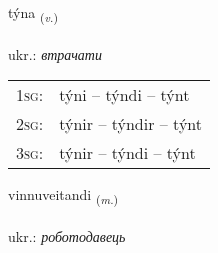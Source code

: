 \documentclass[frontgrid, backgrid]{flacards}\usepackage[]{graphicx}\usepackage[]{xcolor}
\begin{document}
\renewcommand{\flhead}{\vskip5pt \fboxsep=0pt {\small\bfseries\footnotesize Sagnorð | дієслово}}
\renewcommand{\fcfoot}{\vskip5pt \fboxsep=0pt \hspace{2pt}{\small\bfseries\footnotesize 3K}}

\renewcommand{\blhead}{\vskip5pt {\small\bfseries\footnotesize Sagnorð | дієслово }}
\renewcommand{\bcfoot}{\vskip5pt \hspace{2pt}{\small\bfseries\footnotesize 3K}}


{týna \small{\textsubscript{(\textit{v.})}} \\[1ex] %
\textphonetic{[tʰiːna]} \\
ukr.: \emph{втрачати} \\  [2ex]
\renewcommand*{\arraystretch}{0.8}
\begin{tabular}{p{1cm}l}
\textsc{1sg}: & týni -- týndi -- týnt \\ 
\textsc{2sg}: & týnir -- týndir -- týnt \\ 
\textsc{3sg}: & týnir -- týndi -- týnt \\ 
\end{tabular}
}

\renewcommand{\flhead}{\vskip5pt \fboxsep=0pt {\small\bfseries\footnotesize Nafnorð | іменник}}
\renewcommand{\fcfoot}{\vskip5pt \fboxsep=0pt \hspace{2pt}{\small\bfseries\footnotesize 3K}}

\renewcommand{\blhead}{\vskip5pt {\small\bfseries\footnotesize Nafnorð | іменник }}
\renewcommand{\bcfoot}{\vskip5pt \hspace{2pt}{\small\bfseries\footnotesize 3K}}


{vinnuveitandi \small{\textsubscript{(\textit{m.})}} \\[1ex] %
\textphonetic{[vɪnʏveitantɪ]} \\
ukr.: \emph{роботодавець} \\  [2ex]
\renewcommand*{\arraystretch}{0.8}
}
\end{document}
